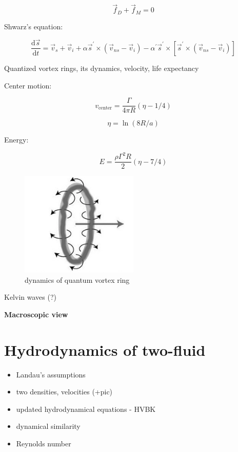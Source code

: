\begin{equation}
\vec{f}_D + \vec{f}_M = 0
\end{equation}

Shwarz's equation:

\begin{equation}
\frac{\text{d}\vec{s}}{\text{d}t} = \vec{v}_s + \vec{v}_i + \alpha\vec{s}^{\prime} \times (\vec{v}_{ns} - \vec{v}_i) - \alpha^{\prime}\vec{s}^{\prime} \times [\vec{s}^{\prime} \times (\vec{v}_{ns} - \vec{v}_i)]
\end{equation}

Quantized vortex rings, its dynamics, velocity, life expectancy

Center motion:

\begin{equation}
v_{\text{center}} = \frac{\Gamma}{4\pi R} (\eta - 1/4)
\end{equation}

\begin{equation}
\eta = \ln(8R/a)
\end{equation}

Energy:

\begin{equation}
E = \frac{\rho \Gamma^2 R}{2} (\eta - 7/4)
\end{equation}


\begin{figure}[h]
	\centering
	\includegraphics[width=0.5\textwidth]{graphics/theory/vortex-ring}
	\caption{dynamics of quantum vortex ring}
	\label{vortex-ring}
\end{figure}

Kelvin waves (?)

\newpage

{\Huge \bfseries Macroscopic view}
\vspace{0.3cm}

\section{Hydrodynamics of two-fluid}
\begin{itemize}
	\item Landau's assumptions
	\item two densities, velocities (+pic)
	\item updated hydrodynamical equations - HVBK
	\item dynamical similarity
	\item Reynolds number
\end{itemize}


